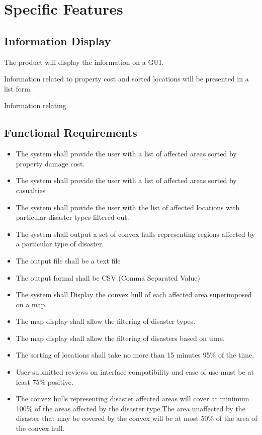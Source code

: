 \documentclass{article}
\begin{document}
 
\section{Specific Features }
\subsection{Information Display}
The product will display the information on a GUI.
 
 Information related to property cost and sorted locations will be presented in a list form.
 
Information relating 
\subsection{Functional Requirements}
    \begin{itemize}
        \item The system shall provide the user with a list of affected areas sorted by property damage cost.
        \item The system shall provide the user with a list of affected areas sorted by casualties
        \item The system shall provide the user with the list of affected locations with particular disaster types filtered out.
        \item The system shall output a set of convex hulls representing regions affected by a particular type of disaster.
        \item The output file shall be a text file
        \item The output formal shall be CSV (Comma Separated Value)
        \item The system shall Display the convex hull of each affected area superimposed on a map.
        \item The map display shall allow the filtering of disaster types.
        \item The map display shall allow the filtering of disasters based on time.
        \item The sorting of locations shall take no more than 15 minutes 95\% of the time.
        \item User-submitted reviews on interface compatibility and ease of use must be at least 75\% positive.
        \item The convex hulls representing disaster affected areas will cover at minimum 100\% of the areas affected by the disaster type.The area unaffected by the disaster that may be covered by the convex will be at most 50\% of the area of the convex hull.
    
    \end{itemize}
\end{document}
